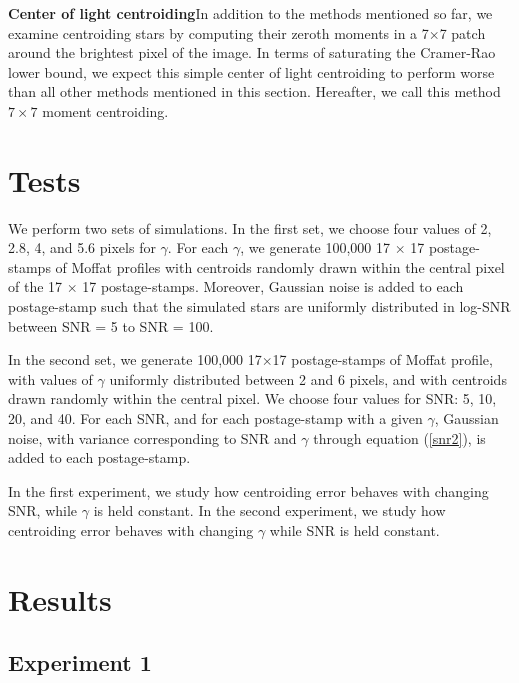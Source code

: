 \documentclass[12pt, preprint]{aastex}
\begin{document}
\item {\bf Center of light centroiding}\quad In addition to the methods 
mentioned so far, we examine centroiding stars by computing their zeroth moments
in a 7$\times$7 patch around the brightest pixel of the image.
In terms of saturating the Cramer-Rao lower bound, we expect this simple 
center of light centroiding to perform worse than all other methods mentioned in 
this section. Hereafter, we call this method $7\times7$ moment centroiding.


\section{Tests}\label{sec:data}

We perform two sets of simulations. In the first set, we choose four values of
2, 2.8, 4, and 5.6 pixels for $\gamma$. For each $\gamma$, we generate 100,000 
17 $\times$ 17 postage-stamps of Moffat profiles with centroids randomly drawn
within the central pixel of the 17 $\times$ 17 postage-stamps. Moreover, Gaussian
noise is added to each postage-stamp such that the simulated stars are uniformly
 distributed in log-SNR between SNR = 5 to SNR = 100.

In the second set, we generate 100,000 17$\times$17 postage-stamps
of Moffat profile, with values of $\gamma$ uniformly distributed 
between 2 and 6 pixels, and with centroids drawn randomly within 
the central pixel. We choose four values for SNR: 5, 10, 20, and 40. 
For each SNR, and for each postage-stamp with a given $\gamma$, 
Gaussian noise, with variance corresponding to SNR and $\gamma$ through equation 
(\ref{snr2}), is added to each postage-stamp.

In the first experiment, we study how centroiding error behaves with changing
SNR, while $\gamma$ is held constant. In the second experiment, we study 
how centroiding error behaves with changing $\gamma$ while SNR is held constant.

\section{Results}\label{sec:result}

\subsection{Experiment 1}
   
\end{document}
